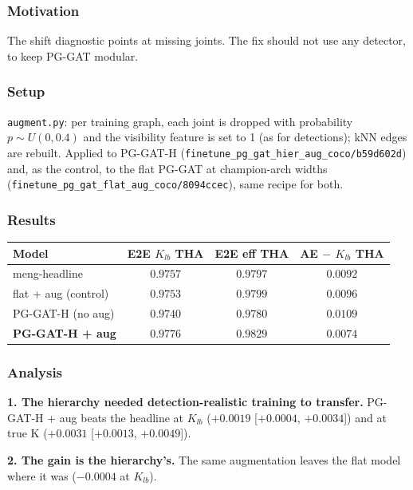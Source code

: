 \subsubsection{Motivation}

The shift diagnostic points at missing joints. The fix should not use any detector, to keep PG-GAT modular.

\subsubsection{Setup}

\texttt{augment.py}: per training graph, each joint is dropped with probability $p \sim U(0, 0.4)$ and the visibility feature is set to 1 (as for detections); kNN edges are rebuilt.
Applied to PG-GAT-H (\texttt{finetune\_pg\_gat\_hier\_aug\_coco/b59d602d}) and, as the control, to the flat PG-GAT at champion-arch widths (\texttt{finetune\_pg\_gat\_flat\_aug\_coco/8094ccec}), same recipe for both.

\subsubsection{Results}

\begin{tabular}{lccc}
\hline
\textbf{Model} & \textbf{E2E $K_{lb}$ THA} & \textbf{E2E eff THA} & \textbf{AE $-$ $K_{lb}$ THA} \\
\hline
meng-headline              & $0.9757$ & $0.9797$ & $0.0092$ \\
flat + aug (control)       & $0.9753$ & $0.9799$ & $0.0096$ \\
PG-GAT-H (no aug)          & $0.9740$ & $0.9780$ & $0.0109$ \\
\textbf{PG-GAT-H + aug}    & $\mathbf{0.9776}$ & $\mathbf{0.9829}$ & $\mathbf{0.0074}$ \\
\hline
\end{tabular}

\subsubsection{Analysis}

\textbf{1. The hierarchy needed detection-realistic training to transfer.} PG-GAT-H + aug beats the headline at $K_{lb}$ ($+0.0019$ [$+0.0004$, $+0.0034$]) and at true K ($+0.0031$ [$+0.0013$, $+0.0049$]).

\textbf{2. The gain is the hierarchy's.} The same augmentation leaves the flat model where it was ($-0.0004$ at $K_{lb}$).

